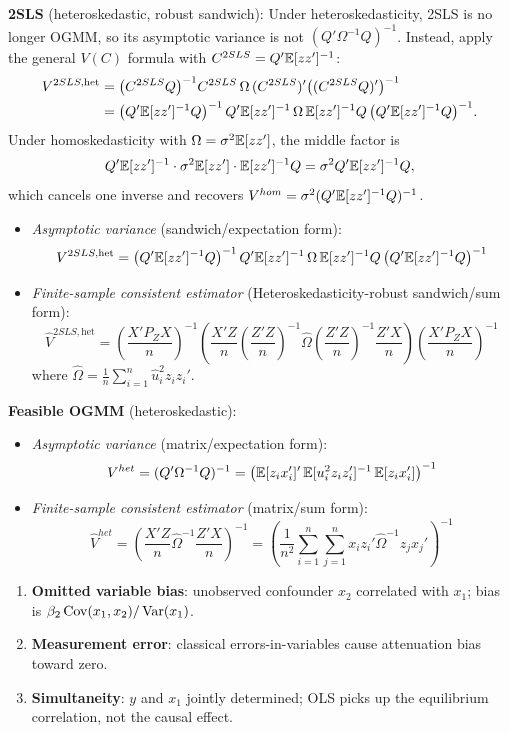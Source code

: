 \begin{remark}
	\textbf{2SLS} (heteroskedastic, robust sandwich):
	Under heteroskedasticity, 2SLS is no longer OGMM, so its asymptotic variance is not $(Q'\Omega^{-1}Q)^{-1}$.  Instead, apply the general $V(C)$ formula with $C^{2SLS} = Q'\mathbb{E}[zz']^{-1}$:
	\begin{align*}
		V^{2SLS,\mathrm{het}}
		&= \bigl(C^{2SLS}Q\bigr)^{-1}C^{2SLS}\,\Omega\,(C^{2SLS})'\bigl((C^{2SLS}Q)'\bigr)^{-1} \\
		&= \bigl(Q'\mathbb{E}[zz']^{-1}Q\bigr)^{-1}\,Q'\mathbb{E}[zz']^{-1}\,\Omega\,\mathbb{E}[zz']^{-1}Q\,\bigl(Q'\mathbb{E}[zz']^{-1}Q\bigr)^{-1}.
	\end{align*}
	Under homoskedasticity with $\Omega=\sigma^2\mathbb{E}[zz']$, the middle factor is \[Q'\mathbb{E}[zz']^{-1}\cdot\sigma^2\mathbb{E}[zz']\cdot\mathbb{E}[zz']^{-1}Q = \sigma^2 Q'\mathbb{E}[zz']^{-1}Q,\] which cancels one inverse and recovers $V^{hom}=\sigma^2(Q'\mathbb{E}[zz']^{-1}Q)^{-1}$.
	\begin{itemize}
		\item \emph{Asymptotic variance} (sandwich/expectation form):
		\[
			V^{2SLS,\mathrm{het}} = \bigl(Q'\mathbb{E}[zz']^{-1}Q\bigr)^{-1}\,Q'\mathbb{E}[zz']^{-1}\,\Omega\,\mathbb{E}[zz']^{-1}Q\,\bigl(Q'\mathbb{E}[zz']^{-1}Q\bigr)^{-1}
		\]
		\item \emph{Finite-sample consistent estimator} (Heteroskedasticity-robust sandwich/sum form):
		\[
			\hat{V}^{2SLS,\mathrm{het}} = \left(\frac{X'P_ZX}{n}\right)^{-1}\left(\frac{X'Z}{n}\left(\frac{Z'Z}{n}\right)^{-1}\hat\Omega\left(\frac{Z'Z}{n}\right)^{-1}\frac{Z'X}{n}\right)\left(\frac{X'P_ZX}{n}\right)^{-1}
		\]
		where $\hat\Omega = \frac{1}{n}\sum_{i=1}^n \hat{u}_i^2 z_iz_i'$.
	\end{itemize}

	\textbf{Feasible OGMM} (heteroskedastic):
	\begin{itemize}
		\item \emph{Asymptotic variance} (matrix/expectation form):
		\[
			V^{het} = (Q'\Omega^{-1}Q)^{-1} = \left(\mathbb{E}[z_ix_i']'\,\mathbb{E}[u_i^2z_iz_i']^{-1}\,\mathbb{E}[z_ix_i']\right)^{-1}
		\]
		\item \emph{Finite-sample consistent estimator} (matrix/sum form):
		\[
			\hat{V}^{het} = \left(\frac{X'Z}{n}\hat{\Omega}^{-1}\frac{Z'X}{n}\right)^{-1} = \left(\frac{1}{n^2}\sum_{i=1}^{n}\sum_{j=1}^{n} x_iz_i'\hat{\Omega}^{-1}z_jx_j'\right)^{-1}
		\]
	\end{itemize}
\end{remark}

\begin{remark}
	\begin{enumerate}[label=(\roman*)]
		\item \textbf{Omitted variable bias}: unobserved confounder $x_2$ correlated with $x_1$; bias is $\beta_2\operatorname{Cov}(x_1,x_2)/\operatorname{Var}(x_1)$.
		\item \textbf{Measurement error}: classical errors-in-variables cause attenuation bias toward zero.
		\item \textbf{Simultaneity}: $y$ and $x_1$ jointly determined; OLS picks up the equilibrium correlation, not the causal effect.
	\end{enumerate}
\end{remark}
